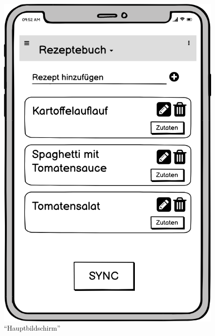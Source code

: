 \documentclass[a4paper, 12pt]{scrreprt}
\begin{document}
\begin{figure}[h!]
	\centering
	\begin{minipage}{.45\textwidth}
		\centering
		\includegraphics[width=1\textwidth]{wireframeRezepte2.png}
		\caption{\enquote{Hauptbildschirm}}
		\label{fig:rezepteFrame}
	\end{minipage}
	\begin{minipage}{.45\textwidth}
		\centering

\end{minipage}
\end{figure}
\end{document}
